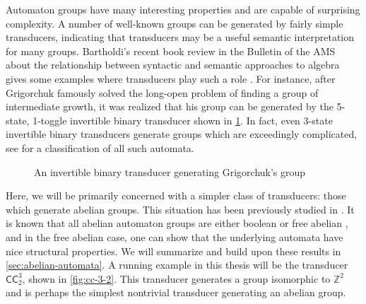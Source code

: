 \documentclass[12pt, letterpaper]{article}
\newcommand{\Z}{\mathbb Z}
\newcommand{\CC}{\mathsf{CC}}
\begin{document}
Automaton groups have many interesting properties and are capable of surprising
complexity. A number of well-known groups can be generated by fairly simple
transducers, indicating that transducers may be a useful semantic
interpretation for many groups. Bartholdi's recent book review in the Bulletin
of the AMS about the relationship between syntactic and semantic approaches to
algebra gives some examples where transducers play such a role
\cite{Bartholdi17:syntax_semantic_review}.  For instance, after Grigorchuk
famously solved the long-open problem of finding a group of intermediate
growth, it was realized that his group can be generated by the 5-state,
1-toggle invertible binary transducer shown in \cref{fig:grigorchuk}.  In fact,
even 3-state invertible binary transducers generate groups which are
exceedingly complicated, see \cite{2008arXiv0803.3555B} for a classification of
all such automata.
\begin{figure}[h]
    \centering
    \caption{An invertible binary transducer generating Grigorchuk's group}
    \label{fig:grigorchuk}
\end{figure}

Here, we will be primarily concerned with a simpler class of transducers: those
which generate abelian groups. This situation has been previously studied in
\cite{Okano-Thesis, Sutner18:abelian_automata}. It is known that all abelian
automaton groups are either boolean or free abelian \cite{Okano-Thesis}, and in
the free abelian case, one can show that the underlying automata have nice
structural properties. We will summarize and build upon these results in
\cref{sec:abelian-automata}.  A running example in this thesis will be the
transducer $\CC^3_2$, shown in \cref{fig:cc-3-2}. This transducer generates a
group isomorphic to $\Z^2$ and is perhaps the simplest nontrivial transducer
generating an abelian group.
\end{document}
